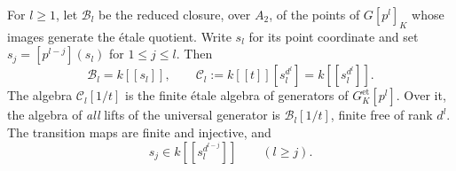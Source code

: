 \begin{lemma}
\label{lem:primitive-coordinates}
For $l\geq 1$, let $\mathcal B_l$ be the reduced closure, over $A_2$,
of the points of $G[p^l]_K$ whose images generate the étale quotient.
Write $s_l$ for its point coordinate and set
$s_j=[p^{l-j}](s_l)$ for $1\leq j\leq l$.  Then
\begin{equation}
 \mathcal B_l=k[[s_l]],\qquad
 \mathcal C_l:=k[[t]][s_l^{d^l}]=k[[s_l^{d^l}]].
 \label{eq:primitive-rings}
\end{equation}
The algebra $\mathcal C_l[1/t]$ is the finite étale algebra of generators
of $G_K^{\mathrm{et}}[p^l]$.  Over it, the algebra of \emph{all} lifts of
the universal generator is $\mathcal B_l[1/t]$, finite free of rank $d^l$.
The transition maps are finite and injective, and
\begin{equation}
 s_j\in k[[s_l^{d^{l-j}}]]\qquad(l\geq j).
 \label{eq:primitive-transitions}
\end{equation}
\end{lemma}

